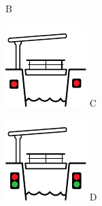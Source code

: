 \begin{figure}[H]
\begin{minipage}[b]{0.23\textwidth}
		\centering
		B
	\end{minipage}
	\hfill
	\begin{minipage}[b]{0.23\textwidth}
		\includegraphics[width=\textwidth]{Hoofdstukken/Bruggen/pdf/brug_doorvaart_verboden.pdf}
		\centering
		C
	\end{minipage}
	\hfill
	\begin{minipage}[b]{0.23\textwidth}
		\includegraphics[width=\textwidth]{Hoofdstukken/Bruggen/pdf/brug_aanstonds_toegestaan.pdf}
		\centering
		D
	\end{minipage}
\end{figure}


